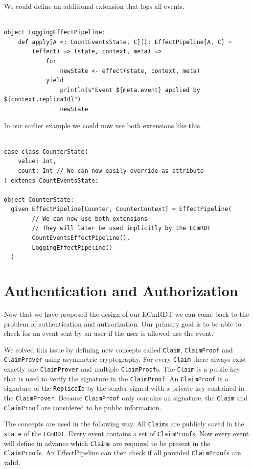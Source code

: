 \documentclass[
	ngerman,
	ruledheaders=section,   %
	class=report,		    %
	thesis={type=bachelor}, %
	accentcolor=9c,			%
	custommargins=false,    %
	marginpar=false,        %
	parskip=half-,          %
	fontsize=11pt,          %
]{tudapub}
\let\code\texttt
\begin{document}
We could define an additional extension that logs all events.

\begin{lstlisting}

object LoggingEffectPipeline:
	def apply[A <: CountEventsState, C](): EffectPipeline[A, C] =
		(effect) => (state, context, meta) =>
			for
				newState <- effect(state, context, meta)
			yield
				println(s"Event ${meta.event} applied by ${context.replicaId}")
				newState

\end{lstlisting}

In our earlier example we could now use both extensions like this.

\begin{lstlisting}

case class CounterState(
	value: Int,
	count: Int // We can now easily override as attribute
) extends CountEventsState:

object CounterState:
  given EffectPipeline[Counter, CounterContext] = EffectPipeline(
		// We can now use both extensions
		// They will later be used implicitly by the ECmRDT
		CountEventsEffectPipeline(),
		LoggingEffectPipeline()
  )

\end{lstlisting}

\section{Authentication and Authorization}

Now that we have proposed the design of our ECmRDT we can come back to the problem of authentication and authorization. Our primary goal is to be able to check for an event sent by an user if the user is allowed use the event. 

We solved this issue by defining new concepts called \code{Claim}, \code{ClaimProof} and \code{ClaimProver} using asymmetric cryptography. For every \code{Claim} there always exist exactly one \code{ClaimProver} and multiple \code{ClaimProof}s. The \code{Claim} is a public key that is used to verify the signature in the \code{ClaimProof}. An \code{ClaimProof} is a signature of the \code{ReplicaId} by the sender signed with a private key contained in the \code{ClaimProver}. Because \code{ClaimProof} only contains an signature, the \code{Claim} and \code{ClaimProof} are considered to be public information. 

The concepts are used in the following way. All \code{Claim}s are publicly saved in the \code{state} of the \code{ECmRDT}. Every event contains a set of \code{ClaimProof}s. Now every event will define in advance which \code{Claim}s are required to be present in the \code{ClaimProof}s. An EffectPipeline can then check if all provided \code{ClaimProof}s are valid. 
\end{document}
